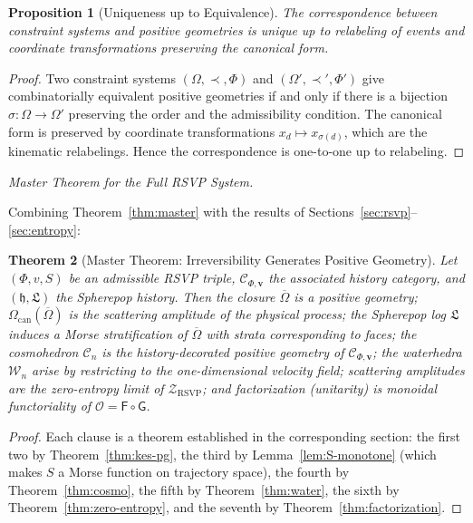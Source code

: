\documentclass[11pt]{article}
\theoremstyle{plain}
\newtheorem{theorem}{Theorem}[section]
\newtheorem{proposition}[theorem]{Proposition}
\theoremstyle{definition}
\theoremstyle{remark}
\newcommand{\Phif}{\Phi}
\newcommand{\vf}{v}
\newcommand{\Sf}{S}
\newcommand{\OmKS}{\Omega}
\newcommand{\hist}{\mathfrak{h}}
\newcommand{\Log}{\mathfrak{L}}
\newcommand{\Cosmo}{\mathcal{C}_n}
\newcommand{\Water}{\mathcal{W}_n}
\newcommand{\CF}{\Omega_{\mathrm{can}}}
\newcommand{\Ccat}{\mathcal{C}_{\Phi,\mathbf{v}}}
\newcommand{\Gfun}{\mathsf{G}}
\newcommand{\Ffun}{\mathsf{F}}
\newcommand{\Ofun}{\mathcal{O}}
\newcommand{\ZRSVP}{\mathcal{Z}_{\mathrm{RSVP}}}
\begin{document}
\begin{proposition}[Uniqueness up to Equivalence]
The correspondence between constraint systems and positive geometries is unique up to relabeling of events and coordinate transformations preserving the canonical form.
\end{proposition}

\begin{proof}
Two constraint systems $(\OmKS, \prec, \Phif)$ and $(\OmKS', \prec', \Phif')$ give combinatorially equivalent positive geometries if and only if there is a bijection $\sigma: \OmKS \to \OmKS'$ preserving the order and the admissibility condition. The canonical form is preserved by coordinate transformations $x_d \mapsto x_{\sigma(d)}$, which are the kinematic relabelings. Hence the correspondence is one-to-one up to relabeling.
\end{proof}

\medskip\noindent\textit{Master Theorem for the Full RSVP System.}

Combining Theorem~\ref{thm:master} with the results of Sections~\ref{sec:rsvp}--\ref{sec:entropy}:

\begin{theorem}[Master Theorem: Irreversibility Generates Positive Geometry]
Let $(\Phif, \vf, \Sf)$ be an admissible RSVP triple, $\Ccat$ the associated history category, and $(\hist, \Log)$ the Spherepop history. Then the closure $\overline{\OmKS}$ is a positive geometry; $\CF(\overline{\OmKS})$ is the scattering amplitude of the physical process; the Spherepop log $\Log$ induces a Morse stratification of $\overline{\OmKS}$ with strata corresponding to faces; the cosmohedron $\Cosmo$ is the history-decorated positive geometry of $\Ccat$; the waterhedra $\Water$ arise by restricting to the one-dimensional velocity field; scattering amplitudes are the zero-entropy limit of $\ZRSVP$; and factorization (unitarity) is monoidal functoriality of $\Ofun = \Ffun \circ \Gfun$.
\end{theorem}

\begin{proof}
Each clause is a theorem established in the corresponding section: the first two by Theorem~\ref{thm:kes-pg}, the third by Lemma~\ref{lem:S-monotone} (which makes $\Sf$ a Morse function on trajectory space), the fourth by Theorem~\ref{thm:cosmo}, the fifth by Theorem~\ref{thm:water}, the sixth by Theorem~\ref{thm:zero-entropy}, and the seventh by Theorem~\ref{thm:factorization}.
\end{proof}
\end{document}
